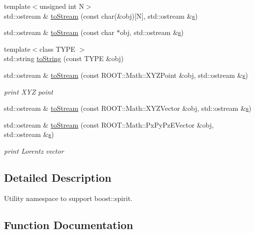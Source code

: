 \begin{DoxyCompactItemize}
\item 
{\footnotesize template$<$unsigned int N$>$ }\\std\+::ostream \& \hyperlink{namespace_d_d4hep_1_1_utils_a44ffcb1297d43e7a738c41a669e40cd6}{to\+Stream} (const char(\&obj)\mbox{[}N\mbox{]}, std\+::ostream \&\hyperlink{_volumes_8cpp_a17ca6bfc8040d695d3cada22a4763d40}{s})
\item 
std\+::ostream \& \hyperlink{namespace_d_d4hep_1_1_utils_a0e52adf037edd29df048973406fc2554}{to\+Stream} (const char $\ast$obj, std\+::ostream \&\hyperlink{_volumes_8cpp_a17ca6bfc8040d695d3cada22a4763d40}{s})
\item 
{\footnotesize template$<$class T\+Y\+PE $>$ }\\std\+::string \hyperlink{namespace_d_d4hep_1_1_utils_a4e482234503764883507107b417e1de2}{to\+String} (const T\+Y\+PE \&obj)
\item 
std\+::ostream \& \hyperlink{namespace_d_d4hep_1_1_utils_a2a135f6ca6327240ccb6a2f796c6fc49}{to\+Stream} (const R\+O\+O\+T\+::\+Math\+::\+X\+Y\+Z\+Point \&obj, std\+::ostream \&\hyperlink{_volumes_8cpp_a17ca6bfc8040d695d3cada22a4763d40}{s})
\begin{DoxyCompactList}\small\item\em print X\+YZ point \end{DoxyCompactList}\item 
std\+::ostream \& \hyperlink{namespace_d_d4hep_1_1_utils_ad01ecddf10c1ce2ef7593b0a01516898}{to\+Stream} (const R\+O\+O\+T\+::\+Math\+::\+X\+Y\+Z\+Vector \&obj, std\+::ostream \&\hyperlink{_volumes_8cpp_a17ca6bfc8040d695d3cada22a4763d40}{s})
\item 
std\+::ostream \& \hyperlink{namespace_d_d4hep_1_1_utils_aba37b7ad17a5c6c9f0db489d583ce2bc}{to\+Stream} (const R\+O\+O\+T\+::\+Math\+::\+Px\+Py\+Pz\+E\+Vector \&obj, std\+::ostream \&\hyperlink{_volumes_8cpp_a17ca6bfc8040d695d3cada22a4763d40}{s})
\begin{DoxyCompactList}\small\item\em print Lorentz vector \end{DoxyCompactList}\end{DoxyCompactItemize}


\subsection{Detailed Description}
Utility namespace to support boost\+::spirit. 

\subsection{Function Documentation}
\hypertarget{namespace_d_d4hep_1_1_utils_a427d8efde90cd13f3934319c89ef6c35}{}\label{namespace_d_d4hep_1_1_utils_a427d8efde90cd13f3934319c89ef6c35} 
